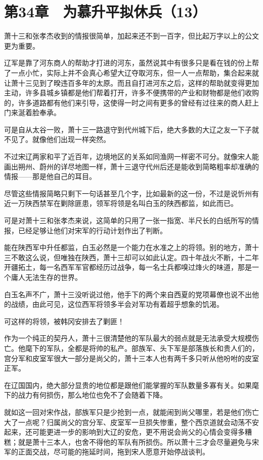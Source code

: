 \section{第34章　为慕升平拟休兵（13）}

萧十三和张孝杰收到的情报很简单，加起来还不到一百字，但比起万字以上的公文更为重要。

辽军是靠了河东商人的帮助才打进的河东，虽然说其中有很多只是看在钱的份上帮了一点小忙，实际上并不会真心希望大辽夺取河东，但一人一点帮助，集合起来就让萧十三见到了暌违百多年的太原。而且自打进河东之后，这样的帮助就变得更加主动，许多县城乡镇都是他们帮着打开，许多不便携带的产业和财物都是他们收购的，许多道路都有他们来引导，这使得一时之间有更多的曾经有过往来的商人赶上门来涎着脸奉承。

可是自从太谷一败，萧十三一路退守到代州城下后，绝大多数的大辽之友一下子就不见了。就像他们出现一样突然。

不过宋辽两家和平了近百年，边境地区的关系如同渔网一样密不可分。就像宋人能画出朔州、蔚州的详尽地图一样，萧十三退守代州后还是能收到简略粗率却准确的情报——那是他自己的耳目。

尽管这些情报简略只剩下一句话甚至几个字，比如最新的这一份，不过是说忻州有近一万陕西禁军在剿除匪患，领军将领是名叫白玉的陕西都监，如此而已。

可是对萧十三和张孝杰来说，这简单的只用了一张一指宽、半尺长的白纸所写的情报，已经足够让他们对宋军的行动计划作出了判断。

能在陕西军中升任都监，白玉必然是一个能力在水准之上的将领。别的地方，萧十三不敢这么说，但唯独在陕西，萧十三却可以如此认定。四十年战火不断，十二年开疆拓土，每一名西军军官都经历过战争，每一名士兵都嗅过烽火的味道，那是一个庸人无法生存的世界。

白玉名声不广，萧十三没听说过他，他手下的两个来自西夏的党项幕僚也说不出他的战绩，由此可见，这位西军将领多半会对军功有着超乎想象的饥渴。

可这样的将领，被韩冈安排去了剿匪！

作为一个纯正的契丹人，萧十三很清楚他的军队最大的弱点就是无法承受大规模伤亡。他麾下的军队，全都是将帅的私产。部族军、头下军是部落族长和贵人们的，宫分军和皮室军很大一部分是尚父的，萧十三本人也有两千多只听从他吩咐的皮室正军。

在辽国国内，绝大部分显贵的地位都是跟他们能掌握的军队数量多寡有关。如果麾下的战力有何损伤，那么地位也免不了会随着下降。

就如这一回对宋作战，部族军只是少抢到一点，就能闹到尚父哪里，若是他们伤亡大了一点呢？归属尚父的宫分军、皮室军一旦损失惨重，整个西京道就会动荡不安起来，还可能更进一步的影响到大辽的安危，更不用说会尚父的心情会变得多糟糕；就是萧十三本人，也舍不得他的军队有所损伤。所以萧十三才会尽量避免与宋军的正面交战，尽可能的拖延时间，拖到宋人愿意开始停战谈判。

